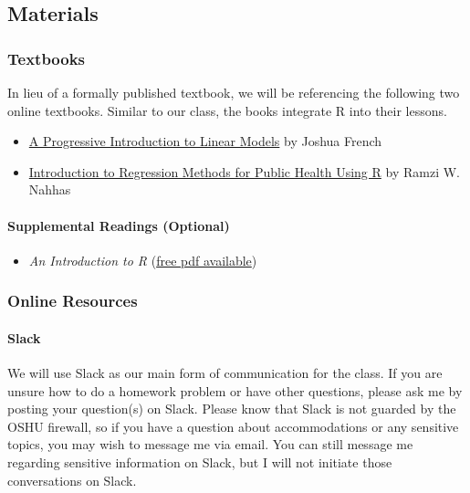 \documentclass[
  letterpaper,
  DIV=11,
  numbers=noendperiod]{scrartcl}
\let\oldparagraph\paragraph
\renewcommand{\paragraph}[1]{\oldparagraph{#1}\mbox{}}
\providecommand{\tightlist}{%
  \setlength{\itemsep}{0pt}\setlength{\parskip}{0pt}}\usepackage{longtable,booktabs,array}
\begin{document}
\hypertarget{materials}{%
\subsection{Materials}\label{materials}}

\hypertarget{textbooks}{%
\subsubsection{Textbooks}\label{textbooks}}

In lieu of a formally published textbook, we will be referencing the
following two online textbooks. Similar to our class, the books
integrate R into their lessons.

\begin{itemize}
\item
  \href{https://jfrench.github.io/LinearRegression/}{A Progressive
  Introduction to Linear Models} by Joshua French
\item
  \href{https://bookdown.org/rwnahhas/RMPH/}{Introduction to Regression
  Methods for Public Health Using R} by Ramzi W. Nahhas
\end{itemize}

\hypertarget{supplemental-readings-optional}{%
\paragraph{Supplemental Readings
(Optional)}\label{supplemental-readings-optional}}

\begin{itemize}
\tightlist
\item
  \emph{An Introduction to R}
  (\href{http://cran.r-project.org/manuals.html}{free pdf available})
\end{itemize}

\hypertarget{online-resources}{%
\subsubsection{Online Resources}\label{online-resources}}

\hypertarget{slack}{%
\paragraph{Slack}\label{slack}}

We will use Slack as our main form of communication for the class. If
you are unsure how to do a homework problem or have other questions,
please ask me by posting your question(s) on Slack. Please know that
Slack is not guarded by the OSHU firewall, so if you have a question
about accommodations or any sensitive topics, you may wish to message me
via email. You can still message me regarding sensitive information on
Slack, but I will not initiate those conversations on Slack.
\end{document}
